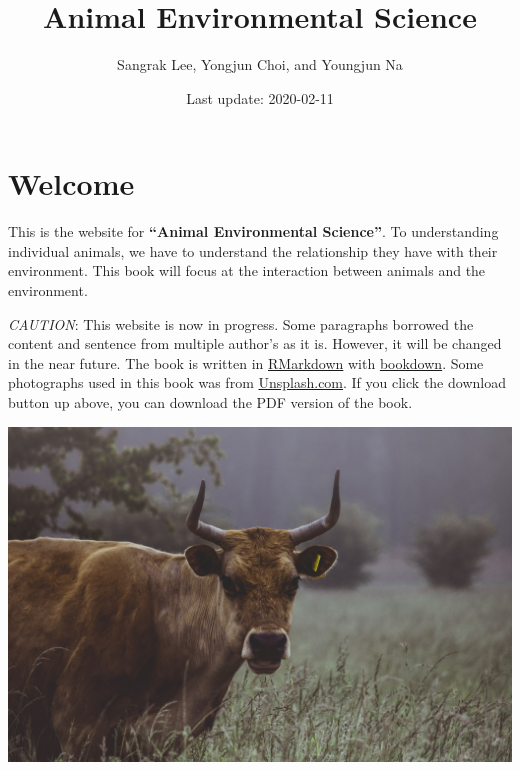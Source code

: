 \documentclass[]{book}
\title{Animal Environmental Science}
\author{Sangrak Lee, Yongjun Choi, and Youngjun Na}
\date{Last update: 2020-02-11}
\begin{document}
\maketitle

{
\setcounter{tocdepth}{1}
\tableofcontents
}
\hypertarget{welcome}{%
\chapter*{Welcome}\label{welcome}}

This is the website for \textbf{``Animal Environmental Science''}. To understanding individual animals, we have to understand the relationship they have with their environment. This book will focus at the interaction between animals and the environment.

\emph{CAUTION}: This website is now in progress. Some paragraphs borrowed the content and sentence from multiple author's as it is. However, it will be changed in the near future. The book is written in \href{https://rmarkdown.rstudio.com}{RMarkdown} with \href{https://bookdown.org}{bookdown}. Some photographs used in this book was from \href{https://unsplash.com/}{Unsplash.com}. If you click the download button up above, you can download the PDF version of the book.

\begin{center}\includegraphics[width=1\linewidth]{figures/wild-cattle} \end{center}
\end{document}
